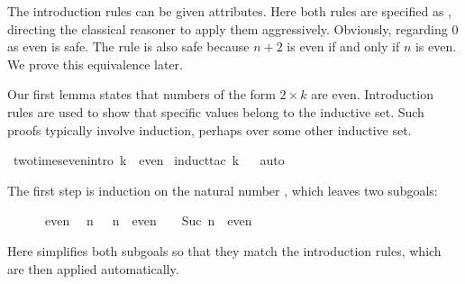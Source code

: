 \begin{isabellebody}
\begin{isamarkuptext}
The introduction rules can be given attributes.  Here
both rules are specified as ,%
directing the classical reasoner to 
apply them aggressively. Obviously, regarding 0 as even is safe.  The
 rule is also safe because $n+2$ is even if and only if $n$ is
even.  We prove this equivalence later.%
\end{isamarkuptext}%
\isamarkuptrue%
%
\isamarkuptrue%
%
\begin{isamarkuptext}%
Our first lemma states that numbers of the form $2\times k$ are even.
Introduction rules are used to show that specific values belong to the
inductive set.  Such proofs typically involve 
induction, perhaps over some other inductive set.%
\end{isamarkuptext}%
\isamarkuptrue%
\isamarkupfalse%
\ two{\isacharunderscore}times{\isacharunderscore}even{\isacharbrackleft}intro{\isacharbang}{\isacharbrackright}{\isacharcolon}\ {\isachardoublequoteopen}{}{\isacharasterisk}k\ {\isasymin}\ even{\isachardoublequoteclose}\isanewline
%
\isadelimproof
%
\endisadelimproof
%
\isatagproof
{}\isamarkupfalse%
\ {\isacharparenleft}induct{\isacharunderscore}tac\ k{\isacharparenright}\isanewline
\ \isamarkupfalse%
\ auto\isanewline
{}\isamarkupfalse%
%
\endisatagproof
{\isafoldproof}%
%
\isadelimproof
%
\endisadelimproof
%
\isadelimproof
%
\endisadelimproof
%
\isatagproof
%
\begin{isamarkuptxt}%
\noindent
The first step is induction on the natural number , which leaves
two subgoals:
\begin{isabelle}%
\ {}{\isachardot}\ {}\ {\isacharasterisk}\ {}\ {\isasymin}\ even\isanewline
\ {}{\isachardot}\ {\isasymAnd}n{\isachardot}\ {}\ {\isacharasterisk}\ n\ {\isasymin}\ even\ {\isasymLongrightarrow}\ {}\ {\isacharasterisk}\ Suc\ n\ {\isasymin}\ even%
\end{isabelle}
Here  simplifies both subgoals so that they match the introduction
rules, which are then applied automatically.


\end{isamarkuptxt}
\end{isabellebody}
